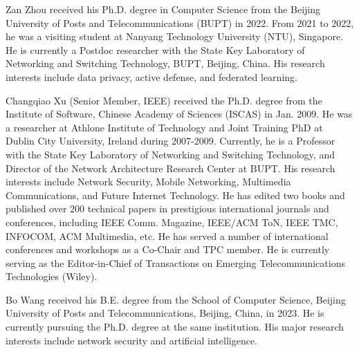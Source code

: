 \documentclass[lettersize,journal]{IEEEtran}
\begin{document}
\begin{IEEEbiography}{Zan Zhou} received his Ph.D. degree in Computer Science from the Beijing University of Posts and Telecommunications (BUPT) in 2022. 
From 2021 to 2022, he was a visiting student at Nanyang Technology University (NTU), Singapore. 
He is currently a Postdoc researcher with the State Key Laboratory of Networking and Switching Technology, BUPT, Beijing, China. His research interests include data privacy, active defense, and federated learning. %
\end{IEEEbiography}

\vspace{11pt}

\begin{IEEEbiography}{Changqiao Xu}
(Senior Member, IEEE) received the Ph.D. degree from the Institute of Software, Chinese Academy of Sciences (ISCAS) in Jan. 2009. He was a researcher at Athlone Institute of Technology and Joint Training PhD at Dublin City University, Ireland during 2007-2009. %
Currently, he is a Professor with the State Key Laboratory of Networking and Switching Technology, and Director of the Network Architecture Research Center at BUPT. His research interests include Network Security, Mobile Networking, Multimedia Communications, and Future Internet Technology. He has edited two books and published over 200 technical papers in prestigious international journals and conferences, including IEEE Comm. Magazine, IEEE/ACM ToN, IEEE TMC, INFOCOM, ACM Multimedia, etc. He has served a number of international conferences and workshops as a Co-Chair and TPC member. He is currently serving as the Editor-in-Chief of Transactions on Emerging Telecommunications Technologies (Wiley).
\end{IEEEbiography}

\vspace{11pt}

\begin{IEEEbiography}{Bo Wang} received his B.E. degree from the School of Computer Science, Beijing University of Posts and Telecommunications, Beijing, China, in 2023. He is currently pursuing the Ph.D. degree at the same institution. His major research interests include network security and artificial intelligence.
\end{IEEEbiography}
\end{document}

